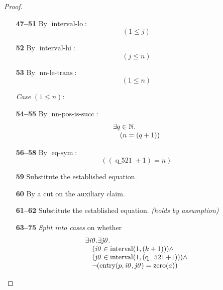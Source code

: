 \documentclass[11pt]{article}
\theoremstyle{plain}
\begin{document}
\begin{proof}
\begin{itemize}[leftmargin=2.8em, itemsep=4pt, parsep=1pt]
  \item[\textbf{47--51}] By $\operatorname{interval\text{-}lo}$:
\begin{equation*}
(1 \leq j)
\end{equation*}

  \item[\textbf{52}] By $\operatorname{interval\text{-}hi}$:
\begin{equation*}
(j \leq n)
\end{equation*}

  \item[\textbf{53}] By $\operatorname{nn\text{-}le\text{-}trans}$:
\begin{equation*}
(1 \leq n)
\end{equation*}

  \item[]\emph{Case} $(1 \leq n)$:
  \item[\textbf{54--55}] By $\operatorname{nn\text{-}pos\text{-}is\text{-}succ}$:
\begin{equation*}
\begin{array}{@{}l@{}} \exists q \in \mathbb{N}. \\ \quad (n = (q + 1)) \end{array}
\end{equation*}

  \item[\textbf{56--58}] By $\operatorname{eq\text{-}sym}$:
\begin{equation*}
((\operatorname{q\_521} + 1) = n)
\end{equation*}

  \item[\textbf{59}] Substitute the established equation.
  \item[\textbf{60}] By a cut on the auxiliary claim.
  \item[\textbf{61--62}] Substitute the established equation.  \emph{(holds by assumption)}
  \item[\textbf{63--75}] \emph{Split into cases} on whether
\begin{equation*}
\begin{array}{@{}l@{}} \exists \mathit{i0}. \exists \mathit{j0}. \\ \quad (\mathit{i0} \in \operatorname{interval}(1, (k + 1))) \wedge \\ \quad (\mathit{j0} \in \operatorname{interval}(1, (\operatorname{q\_521} + 1))) \wedge \\ \quad \neg (\operatorname{entry}(p, \mathit{i0}, \mathit{j0}) = \operatorname{zero}(a)) \end{array}
\end{equation*}


\end{itemize}
\end{proof}
\end{document}
